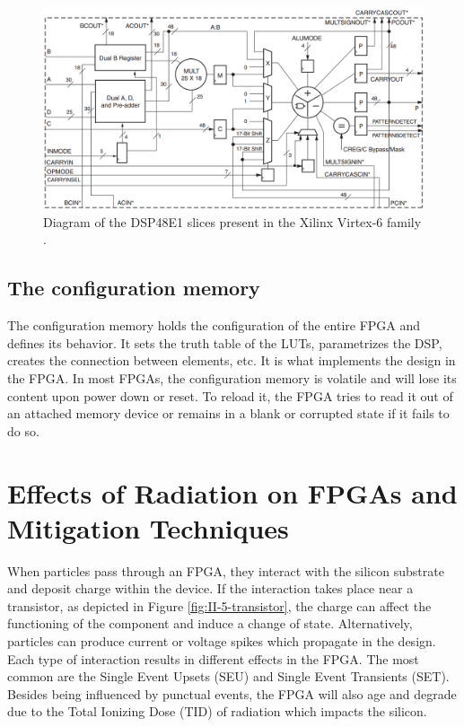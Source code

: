       \begin{figure}[h!]
        \centering
        \includegraphics[width=\textwidth]{img/II-5-irradiation/dsp.png}
        \caption{Diagram of the DSP48E1 slices present in the Xilinx Virtex-6 family \cite{VIRTEX-DSP}.}
        \label{fig:II-5-dsp}
      \end{figure}

    \subsection{The configuration memory}

      The configuration memory holds the configuration of the entire FPGA and defines its behavior. It sets the truth table of the LUTs, parametrizes the DSP, creates the connection between elements, etc. It is what implements the design in the FPGA. In most FPGAs, the configuration memory is volatile and will lose its content upon power down or reset. To reload it, the FPGA tries to read it out of an attached memory device or remains in a blank or corrupted state if it fails to do so.

  \section{Effects of Radiation on FPGAs and Mitigation Techniques}

    When particles pass through an FPGA, they interact with the silicon substrate and deposit charge within the device. If the interaction takes place near a transistor, as depicted in Figure \ref{fig:II-5-transistor}, the charge can affect the functioning of the component and induce a change of state. Alternatively, particles can produce current or voltage spikes which propagate in the design. Each type of interaction results in different effects in the FPGA. The most common are the Single Event Upsets (SEU) and Single Event Transients (SET). Besides being influenced by punctual events, the FPGA will also age and degrade due to the Total Ionizing Dose (TID) of radiation which impacts the silicon.

